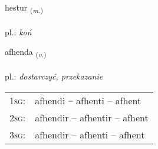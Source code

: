 \documentclass[frontgrid, backgrid]{flacards}\usepackage[]{graphicx}\usepackage[]{xcolor}
\begin{document}
\renewcommand{\flhead}{\vskip5pt \fboxsep=0pt {\small\bfseries\footnotesize Nafnorð | Noun}}
\renewcommand{\fcfoot}{\vskip5pt \fboxsep=0pt \hspace{2pt}{\small\bfseries\footnotesize 2K}}

\renewcommand{\blhead}{\vskip5pt {\small\bfseries\footnotesize Nafnorð | Noun }}
\renewcommand{\bcfoot}{\vskip5pt \hspace{2pt}{\small\bfseries\footnotesize 2K}}


{hestur \small{\textsubscript{(\textit{m.})}} \\[1ex] %
\textphonetic{[hɛstʏr]} \\
pl.: \emph{koń} \\  [2ex]
\renewcommand*{\arraystretch}{0.8}
}

\renewcommand{\flhead}{\vskip5pt \fboxsep=0pt {\small\bfseries\footnotesize Sagnorð | Verb}}
\renewcommand{\fcfoot}{\vskip5pt \fboxsep=0pt \hspace{2pt}{\small\bfseries\footnotesize 2K}}

\renewcommand{\blhead}{\vskip5pt {\small\bfseries\footnotesize Sagnorð | Verb }}
\renewcommand{\bcfoot}{\vskip5pt \hspace{2pt}{\small\bfseries\footnotesize 2K}}


{afhenda \small{\textsubscript{(\textit{v.})}} \\[1ex] %
\textphonetic{[afhɛnta]} \\
pl.: \emph{dostarczyć, przekazanie} \\  [2ex]
\renewcommand*{\arraystretch}{0.8}
\begin{tabular}{p{1cm}l}
\textsc{1sg}: & afhendi -- afhenti -- afhent \\ 
\textsc{2sg}: & afhendir -- afhentir -- afhent \\ 
\textsc{3sg}: & afhendir -- afhenti -- afhent \\ 
\end{tabular}
}
\end{document}
